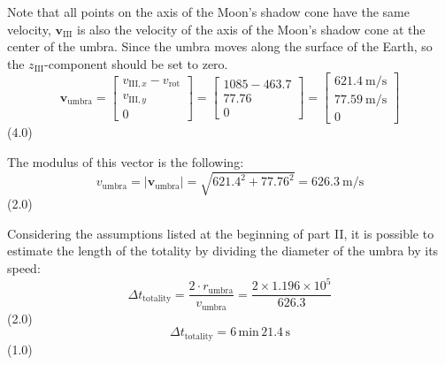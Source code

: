 \begin{description}
  Note that all points on the axis of the Moon's shadow cone have the same
  velocity, $\mathbf{v}_{\mathrm{III}}$ is also the velocity of the axis of
  the Moon's shadow cone at the center of the umbra. Since the umbra moves
  along the surface of the Earth, so the $z_{\mathrm{III}}$-component should
  be set to zero.
  \[
    \mathbf{v}_{\mathrm{umbra}} =
    \begin{bmatrix}
      v_{\mathrm{III},x} - v_{\mathrm{rot}}\\
      v_{\mathrm{III},y}\\
      0
    \end{bmatrix}
    =
    \begin{bmatrix}
      1085 - 463.7\\
      77.76\\
      0
    \end{bmatrix}
    =
    \begin{bmatrix}
      621.4\ \mathrm{m/s}\\
      77.59\ \mathrm{m/s}\\ %
      0
    \end{bmatrix}
  \]
  \hfill(4.0)

  The modulus of this vector is the following:
  \[
    v_{\mathrm{umbra}} = |\mathbf{v}_{\mathrm{umbra}}|
      = \sqrt{621.4^2 + 77.76^2} = 626.3\ \mathrm{m/s}
  \]
  \hfill(2.0)

\item[(k)] Considering the assumptions listed at the beginning of part II, it
  is possible to estimate the length of the totality by dividing the diameter
  of the umbra by its speed:
  \[
    \Delta t_{\mathrm{totality}}
      = \frac{2 \cdot r_{\mathrm{umbra}}}{v_{\mathrm{umbra}}}
      = \frac{2 \times 1.196 \times 10^{5}}{626.3}
  \]
  \hfill(2.0)
  \[
    \boxed{\Delta t_{\mathrm{totality}} = 6\,\mathrm{min}\,21.4\,\mathrm{s}}
  \]
  \hfill(1.0)
\end{description}
